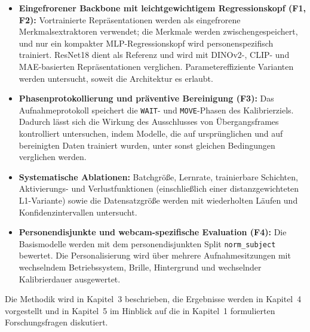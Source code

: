 \documentclass[
  11pt,
  a4paper,
  oneside,
  DIV=12,                 %
  BCOR=8mm,               %
  parskip=half,           %
  headings=normal,
  bibliography=totoc,     %
  listof=totoc            %
]{scrreprt}
\newcommand{\code}[1]{\texttt{#1}}
\begin{document}
\begin{itemize}
  \item \textbf{Eingefrorener Backbone mit leichtgewichtigem Regressionskopf (F1, F2):} Vortrainierte Repräsentationen werden als eingefrorene Merkmalsextraktoren verwendet; die Merkmale werden zwischengespeichert, und nur ein kompakter MLP-Regressionskopf wird personenspezifisch trainiert. ResNet18 dient als Referenz und wird mit DINOv2-, CLIP- und MAE-basierten Repräsentationen verglichen. Parametereffiziente Varianten werden untersucht, soweit die Architektur es erlaubt.
  \item \textbf{Phasenprotokollierung und präventive Bereinigung (F3):} Das Aufnahmeprotokoll speichert die \code{WAIT}- und \code{MOVE}-Phasen des Kalibrierziels. Dadurch lässt sich die Wirkung des Ausschlusses von Übergangsframes kontrolliert untersuchen, indem Modelle, die auf ursprünglichen und auf bereinigten Daten trainiert wurden, unter sonst gleichen Bedingungen verglichen werden.
  \item \textbf{Systematische Ablationen:} Batchgröße, Lernrate, trainierbare Schichten, Aktivierungs- und Verlustfunktionen (einschließlich einer distanzgewichteten L1-Variante) sowie die Datensatzgröße werden mit wiederholten Läufen und Konfidenzintervallen untersucht.
  \item \textbf{Personendisjunkte und webcam-spezifische Evaluation (F4):} Die Basismodelle werden mit dem personendisjunkten Split \code{norm\_subject} bewertet. Die Personalisierung wird über mehrere Aufnahmesitzungen mit wechselndem Betriebssystem, Brille, Hintergrund und wechselnder Kalibrierdauer ausgewertet.
\end{itemize}

Die Methodik wird in Kapitel~3 beschrieben, die Ergebnisse werden in Kapitel~4 vorgestellt und in Kapitel~5 im Hinblick auf die in Kapitel~1 formulierten Forschungsfragen diskutiert.

\renewcommand{\bibname}{Literaturverzeichnis}


\end{document}
